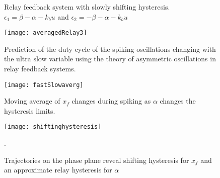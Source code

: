\documentclass[a4paper, 12pt]{article}
\begin{document}
\begin{figure}[tbp]
{
}
\caption{Relay feedback system with slowly shifting hysteresis.$\epsilon_1 = \beta - \alpha - k_bu$ and $\epsilon_2 = -\beta - \alpha - k_bu$}
\label{fig:bursting_step2}
\end{figure}



\begin{figure}[tbp]
\texttt{[image: averagedRelay3]}
\caption{Prediction of the duty cycle of the spiking oscillations changing with the ultra slow variable using the theory of asymmetric oscillations in relay feedback systems.}
\label{fig:bursting_step2.1}
\end{figure}


\begin{figure}
\texttt{[image: fastSlowaverg]}
\caption{Moving average of $x_f$ changes during spiking as $\alpha$ changes the hysteresis limits.}
\label{fig:bursting_step3.1}
\end{figure}

\begin{figure}
\texttt{[image: shiftinghysteresis]}
\caption{Trajectories on the phase plane reveal shifting hysteresis for $x_f$ and an approximate relay hysteresis for $\alpha$}.
\label{fig:bursting_step3.2}
\end{figure}
\end{document}
